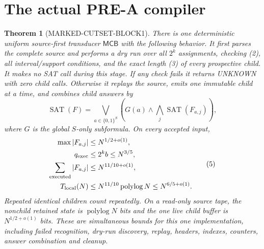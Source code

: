 \documentclass[11pt]{article}
\newtheorem{theorem}{Theorem}
\newcommand{\SAT}{\operatorname{SAT}}
\newcommand{\MCB}{\mathsf{MCB}}
\begin{document}
\section{The actual PRE-A compiler}
\begin{theorem}[MARKED-CUTSET-BLOCK1]
There is one deterministic uniform source-first transducer $\MCB$ with the
following behavior.  It first parses the complete source and performs a dry
run over all $2^k$ assignments, checking (2), all interval/support conditions,
and the exact length (3) of every prospective child.  It makes no SAT call
during this stage.  If any check fails it returns UNKNOWN with zero child
calls.  Otherwise it replays the source, emits one immutable child at a time,
and combines child answers by
\[
 \SAT(F)=\bigvee_{a\in\{0,1\}^{S}}
 \left(G(a)\wedge\bigwedge_j\SAT(F_{a,j})\right),           \tag{4}
\]
where $G$ is the global $S$-only subformula.  On every accepted input,
\[
 \begin{split}
  \max |F_{a,j}|&\le N^{1/2+o(1)},\\
  q_{\rm exec}&\le 2^k b\le N^{3/5},\\
  \sum_{\rm executed}|F_{a,j}|&\le N^{11/10+o(1)},\\
  T_{\rm local}(N)&\le N^{11/10}\operatorname{polylog}N
                     \le N^{6/5+o(1)}.
 \end{split}                                                \tag{5}
\]
Repeated identical children count repeatedly.  On a read-only source tape,
the nonchild retained state is $\operatorname{polylog}N$ bits and the one live
child buffer is $N^{1/2+o(1)}$ bits.  These are simultaneous bounds for this
one implementation, including failed recognition, dry-run discovery, replay,
headers, indexes, counters, answer combination and cleanup.
\end{theorem}
\end{document}
